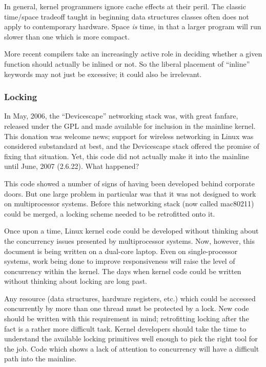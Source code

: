 \documentclass[a4paper,8pt,english]{sphinxmanual}
\begin{document}
In general, kernel programmers ignore cache effects at their peril.  The
classic time/space tradeoff taught in beginning data structures classes
often does not apply to contemporary hardware.  Space \emph{is} time, in that a
larger program will run slower than one which is more compact.

More recent compilers take an increasingly active role in deciding whether
a given function should actually be inlined or not.  So the liberal
placement of ``inline'' keywords may not just be excessive; it could also be
irrelevant.


\subsubsection{Locking}
\label{process/4.Coding:locking}
In May, 2006, the ``Devicescape'' networking stack was, with great
fanfare, released under the GPL and made available for inclusion in the
mainline kernel.  This donation was welcome news; support for wireless
networking in Linux was considered substandard at best, and the Devicescape
stack offered the promise of fixing that situation.  Yet, this code did not
actually make it into the mainline until June, 2007 (2.6.22).  What
happened?

This code showed a number of signs of having been developed behind
corporate doors.  But one large problem in particular was that it was not
designed to work on multiprocessor systems.  Before this networking stack
(now called mac80211) could be merged, a locking scheme needed to be
retrofitted onto it.

Once upon a time, Linux kernel code could be developed without thinking
about the concurrency issues presented by multiprocessor systems.  Now,
however, this document is being written on a dual-core laptop.  Even on
single-processor systems, work being done to improve responsiveness will
raise the level of concurrency within the kernel.  The days when kernel
code could be written without thinking about locking are long past.

Any resource (data structures, hardware registers, etc.) which could be
accessed concurrently by more than one thread must be protected by a lock.
New code should be written with this requirement in mind; retrofitting
locking after the fact is a rather more difficult task.  Kernel developers
should take the time to understand the available locking primitives well
enough to pick the right tool for the job.  Code which shows a lack of
attention to concurrency will have a difficult path into the mainline.
\end{document}
